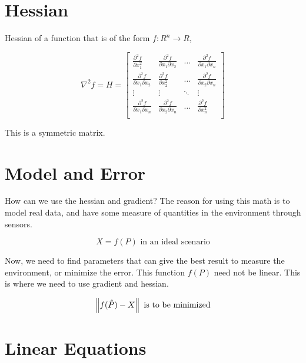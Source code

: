 \section{Hessian}

Hessian of a function that is of the form $f: R^n \to R$, 

\begin{equation}
    \nabla^2 f = H = \begin{bmatrix}
    \frac{\partial^2 f}{\partial x_1^2} & \frac{\partial^2 f}{\partial x_1 \partial x_2} & \hdots & \frac{\partial^2 f}{\partial x_1 \partial x_n} \\
    \frac{\partial^2 f}{\partial x_1 \partial x_2} & \frac{\partial^2 f}{\partial x_2^2} & \hdots & \frac{\partial^2 f}{\partial x_2 \partial x_n} \\
    \vdots & \vdots & \ddots & \vdots \\
    \frac{\partial^2 f}{\partial x_1 \partial x_n} & \frac{\partial^2 f}{\partial x_2 \partial x_n} & \hdots & \frac{\partial^2 f}{\partial x_n^2} \\
    \end{bmatrix}
\end{equation}

This is a symmetric matrix.

\section{Model and Error}

How can we use the hessian and gradient? The reason for using this math is to model real data, and have some measure of quantities in the environment through sensors.

\begin{equation}
    X = f(P) \text{ in an ideal scenario}
\end{equation}

Now, we need to find parameters that can give the best result to measure the environment, or minimize the error. This function $f(P)$ need not be linear. This is where we need to use gradient and hessian.

\begin{equation}
    \left\lVert f(\hat{P}) - X\right\rVert \text{ is to be minimized}
\end{equation}

\section{Linear Equations}

